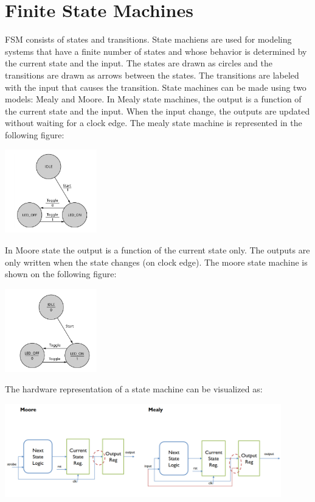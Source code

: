 \section{Finite State Machines}

FSM consists of states and transitions.
State machiens are used for modeling systems that have a finite number
of states and whose behavior is determined by the current state and
the input. The states are drawn as circles and the transitions are
drawn as arrows between the states. The transitions are labeled with
the input that causes the transition.
State machines can be made using two models: Mealy and Moore. In
Mealy state machines, the output
is a function of the current state and the input.
When the input change, the outputs are updated without waiting for a clock
edge. The mealy state machine is represented in the following figure:

\begin{center}
	\includegraphics[width=0.3\textwidth]{images/mealy.png}
\end{center}

In Moore state the output is a function of the current state only.
The outputs are only written when the state changes (on clock edge).
The moore state machine is shown on the following figure:

\begin{center}
	\includegraphics[width=0.3\textwidth]{images/moore.png}
\end{center}


The hardware representation of a state machine can be visualized as:

\begin{center}
	\includegraphics[width=0.9\textwidth]{images/fsm_hardware.png}
\end{center}

